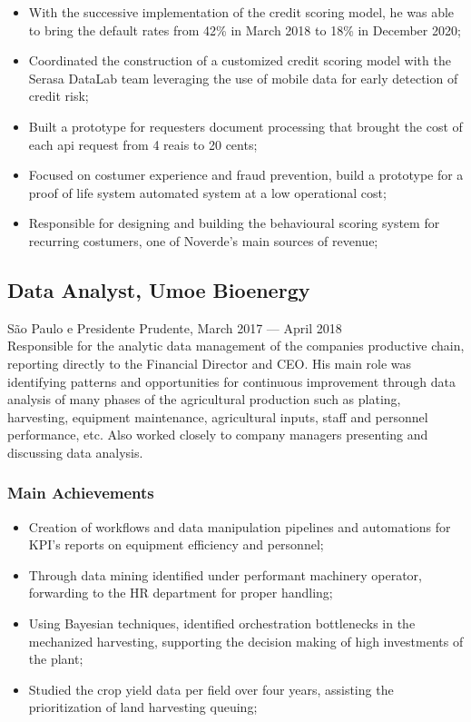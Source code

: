 \documentclass{article}
\newcommand{\jobdate}[3]{
\large
\vspace{0.05em} 
  {#1, #2 --- #3}
\vspace{0.5em} 
\\
}
\begin{document}
\begin{itemize}

\item{With the successive implementation of the credit scoring model, he was able to bring the default rates from 42\% in March 2018 to 18\% in December 2020;}
\item{Coordinated the construction of a customized credit scoring model with the Serasa DataLab team leveraging the use of mobile data for early detection of credit risk;}
\item{Built a prototype for requesters document processing that brought the cost of each api request from 4 reais to 20 cents;}
\item{Focused on costumer experience and fraud prevention, build a prototype for a proof of life system automated system at a low operational cost;}
\item{Responsible for designing and building the behavioural scoring system for recurring costumers, one of Noverde's main sources of revenue;}
\end{itemize}

\subsection{Data Analyst, Umoe Bioenergy}
\jobdate{São Paulo e Presidente Prudente}{March 2017}{April 2018}
Responsible for the analytic data management of the companies productive chain, reporting directly to the Financial Director and CEO. His main role was identifying patterns and opportunities for continuous improvement through data analysis of many phases of the agricultural production such as plating, harvesting, equipment maintenance, agricultural inputs, staff and personnel performance, etc. Also worked closely to company managers presenting and discussing data analysis.
\subsubsection{Main Achievements}

\begin{itemize}
\item{Creation of workflows and data manipulation pipelines and automations for KPI's reports on equipment efficiency and personnel;}
\item{Through data mining identified under performant machinery operator, forwarding to the HR department for proper handling;}
\item{Using Bayesian techniques, identified orchestration bottlenecks in the mechanized harvesting, supporting the decision making of high investments of the plant;}
\item{Studied the crop yield data per field over four years, assisting the prioritization of land harvesting queuing;}
\end{itemize}
\end{document}
